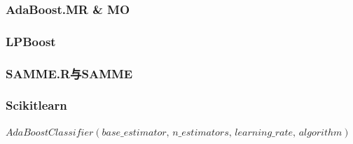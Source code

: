 \documentclass[a4paper]{article}
\begin{document}
		\subsubsection{AdaBoost.MR \& MO}
		\subsubsection{LPBoost}									
		\subsubsection{SAMME.R与SAMME}
		\subsubsection{Scikit\-learn}
				$AdaBoostClassifier(base\_estimator,\,n\_estimators,\,learning\_rate,\,algorithm)$
\end{document}
